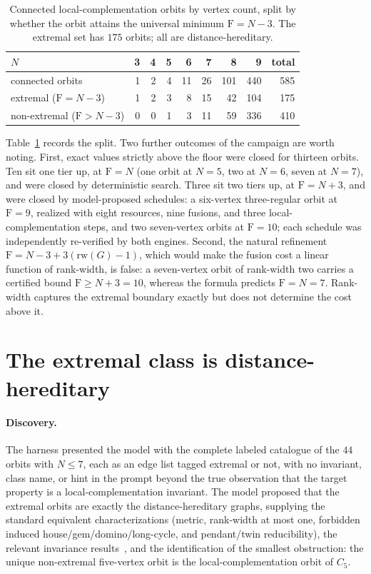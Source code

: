 \documentclass[11pt]{article}
\theoremstyle{definition}
\theoremstyle{remark}
\newcommand{\F}{\mathrm{F}}
\newcommand{\rw}{\mathrm{rw}}
\newcommand{\N}{N}
\begin{document}
\begin{table}[t]
\centering
\begin{tabular}{lrrrrrrrr}
\toprule
$\N$ & 3 & 4 & 5 & 6 & 7 & 8 & 9 & total\\
\midrule
connected orbits           & 1 & 2 & 4 & 11 & 26 & 101 & 440 & 585\\
extremal ($\F=\N-3$)       & 1 & 2 & 3 &  8 & 15 &  42 & 104 & 175\\
non-extremal ($\F>\N-3$)   & 0 & 0 & 1 &  3 & 11 &  59 & 336 & 410\\
\bottomrule
\end{tabular}
\caption{Connected local-complementation orbits by vertex count, split by whether the orbit attains
the universal minimum $\F=\N-3$. The extremal set has $175$ orbits; all are distance-hereditary.}
\label{tab:counts}
\end{table}

Table~\ref{tab:counts} records the split. Two further outcomes of the campaign are worth noting.
First, exact values strictly above the floor were closed for thirteen orbits. Ten sit one tier up,
at $\F=\N$ (one orbit at $\N=5$, two at $\N=6$, seven at $\N=7$), and were closed by deterministic
search. Three sit two tiers up, at $\F=\N+3$, and were closed by model-proposed schedules: a
six-vertex three-regular orbit at $\F=9$, realized with eight resources, nine fusions, and three
local-complementation steps, and two seven-vertex orbits at $\F=10$; each schedule was
independently re-verified by both engines. Second, the natural refinement
$\F=\N-3+3(\rw(G)-1)$, which would make the fusion cost a linear function of rank-width, is false:
a seven-vertex orbit of rank-width two carries a certified bound $\F\ge \N+3=10$, whereas the
formula predicts $\F=\N=7$. Rank-width captures the extremal boundary exactly but does not
determine the cost above it.

\section{The extremal class is distance-hereditary}\label{sec:characterization}

\paragraph{Discovery.} The harness presented the model with the complete labeled catalogue of the
$44$ orbits with $\N\le 7$, each as an edge list tagged extremal or not, with no invariant, class
name, or hint in the prompt beyond the true observation that the target property is a
local-complementation invariant. The model proposed that the extremal orbits are exactly the
distance-hereditary graphs, supplying the standard equivalent characterizations (metric, rank-width
at most one, forbidden induced house/gem/domino/long-cycle, and pendant/twin reducibility), the
relevant invariance results~\cite{bandeltmulder,oum-rw,bouchet}, and the identification of the
smallest obstruction: the unique non-extremal five-vertex orbit is the local-complementation orbit
of $C_5$.
\end{document}
